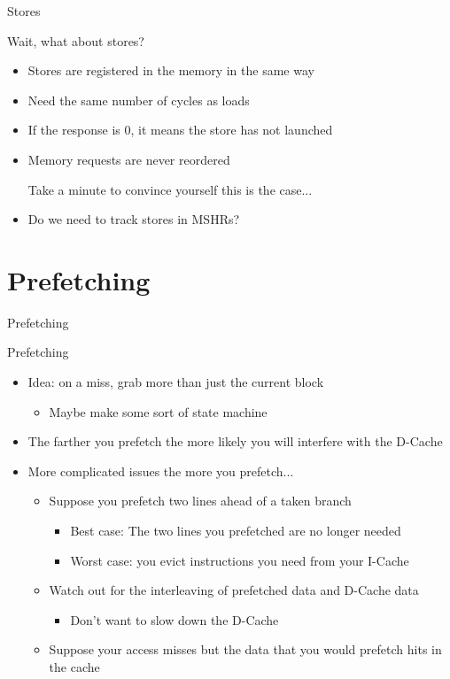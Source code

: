 \documentclass[table,dvipsnames]{beamer}
\begin{document}
\begin{frame}[fragile]{Stores}
	\begin{block}{{Wait, what about stores?}}
	\begin{itemize}
		\item {Stores are registered in the memory in the same way}
		\item {Need the same number of cycles as loads}
		\item {If the response is 0,  it means the store has not launched}
		\item {Memory requests are never reordered}
		\begin{itemize}{Take a minute to convince yourself this is the case...} \end{itemize}
		\item {Do we need to track stores in MSHRs?}
	\end{itemize}

	\end{block}	
\end{frame}


\section{Prefetching}
\begin{frame}[fragile]{Prefetching}
	\begin{block}{Prefetching}
	\begin{itemize}
		\item Idea: on a miss, grab more than just the current block
		\begin{itemize} \item Maybe make some sort of state machine \end{itemize}
		\item The farther you prefetch the more likely you will interfere with the D-Cache
		\item More complicated issues the more you prefetch...
		\begin{itemize} 
			\item Suppose you prefetch two lines ahead of a taken branch
			\begin{itemize} \item Best case: The two lines you prefetched are no longer needed 
			\item Worst case: you evict instructions you need from your I-Cache \end{itemize}
			\item Watch out for the interleaving of prefetched data and D-Cache data
			\begin{itemize} \item Don't want to slow down the D-Cache \end{itemize}
			\item Suppose your access misses but the data that you would prefetch hits in the cache
		\end{itemize}
	\end{itemize}

	\end{block}	
\end{frame}
\end{document}
